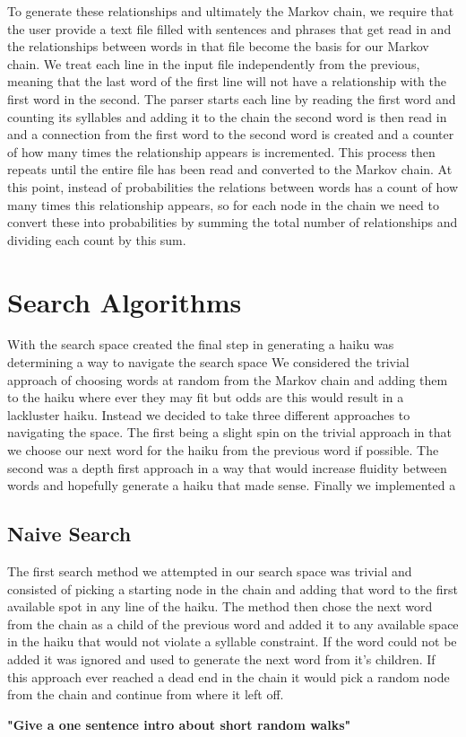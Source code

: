 \documentclass[]{article}
\newcommand{\comment}[1]
{\par {\bfseries \color{green} #1 \par}}
\begin{document}
To generate these relationships and ultimately the Markov chain, we require that the user provide a text file filled with sentences and phrases that get read in and the relationships between words in that file become the basis for our Markov chain. We treat each line in the input file independently from the previous, meaning that the last word of the first line will not have a relationship with the first word in the second. The parser starts each line by reading the first word and counting its syllables and adding it to the chain the second word is then read in and a connection from the first word to the second word is created and a counter of how many times the relationship appears is incremented. This process then repeats until the entire file has been read and converted to the Markov chain. At this point, instead of probabilities the relations between words has a count of how many times this relationship appears, so for each node in the chain we need to convert these into probabilities by summing the total number of relationships and dividing each count by this sum.

\section{Search Algorithms}
With the search space created the final step in generating a haiku was determining a way to navigate the search space We considered the trivial approach of choosing words at random from the Markov chain and adding them to the haiku where ever they may fit but odds are this would result in a lackluster haiku. Instead we decided to take three different approaches to navigating the space. The first being a slight spin on the trivial approach in that we choose our next word for the haiku from the previous word if possible. The second was a depth first approach in a way that would increase fluidity between words and hopefully generate a haiku that made sense. Finally we implemented a 

\subsection{Naive Search}
The first search method we attempted in our search space was trivial and consisted of picking a starting node in the chain and adding that word to the first available spot in any line of the haiku. The method then chose the next word from the chain as a child of the previous word and added it to any available space in the haiku that would not violate a syllable constraint. If the word could not be added it was ignored and used to generate the next word from it's children. If this approach ever reached a dead end in the chain it would pick a random node from the chain and continue from where it left off.\comment{"Give a one sentence intro about short random walks"}
\end{document}
